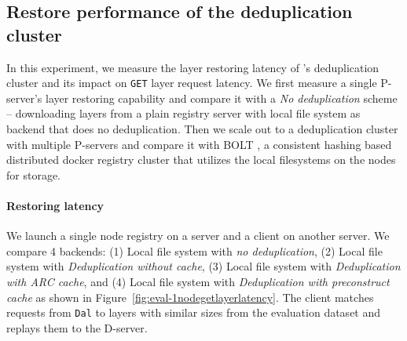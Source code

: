 

\subsection{Restore performance of the deduplication cluster}
\label{sec:eval-dedup}




In this experiment, we measure the layer restoring latency of \sysname's deduplication cluster 
and its impact on \texttt{GET} layer request latency.
We first measure a single P-server's layer restoring capability and compare it with 
a \emph{No deduplication} scheme -- 
downloading layers from a plain registry server with local file system as backend
that does no deduplication.
Then we scale out to a deduplication cluster with multiple P-servers
and compare it with BOLT \cite{littley2019bolt}, 
a consistent hashing based distributed docker registry cluster 
that utilizes the local filesystems on the nodes for storage.
%
%

\paragraph{Restoring latency}
We launch a single node registry on a server and 
a client on another server.
We compare 4 backends:
(1) Local file system with \emph{no deduplication},
(2) Local file system with \sysname \emph{Deduplication without cache},
(3) Local file system with \sysname \emph{Deduplication with ARC cache}, and
(4) Local file system with \sysname \emph{Deduplication with preconstruct cache}
as shown in Figure~\ref{fig:eval-1nodegetlayerlatency}.
%
The client matches requests from \texttt{Dal} to layers with similar sizes 
from the evaluation dataset and replays them to the D-server.

